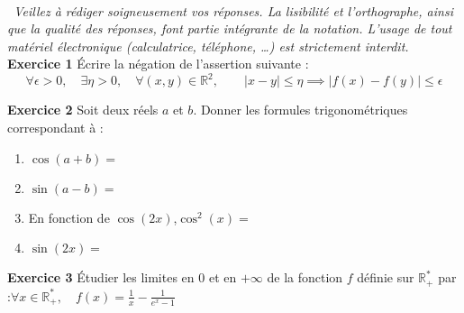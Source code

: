     \pagestyle{fancy}
    \fancyhf{}
    \cfoot{\thepage}
    
    \noindent \textsf{}\\[-25pt]
    
    \begin{center}
    \end{center}
    
    \noindent \textit{\triangleright \ Veillez à rédiger soigneusement vos réponses. La lisibilité et l'orthographe, ainsi que la qualité des réponses, font partie intégrante de la notation. L'usage de tout matériel électronique (calculatrice, téléphone, \dots) est strictement interdit.}\\
    
    
    \noindent \textbf{Exercice 1} Écrire la négation de l'assertion suivante :
    \[ \forall \epsilon > 0,\quad \exists \eta > 0,\quad \forall \left(x, y\right) \in \mathbb{R}^2,\qquad \left| x - y\right| \leq \eta \implies \left| f\left(x\right) - f\left(y\right) \right| \leq \epsilon\]
    
    \vspace{6mm}
    
    \noindent \textbf{Exercice 2} Soit deux réels $a$ et $b$. Donner les formules trigonométriques correspondant à :
    \begin{enumerate}
        \item[\bullet] $\cos\left(a + b\right) = $
        
        \item[\bullet] $\sin\left(a - b\right) = $
        
        \item[\bullet] En fonction de $\cos\left(2x\right)$,\quad $\cos^2\left(x\right) =$
        
        \item[\bullet] $\sin\left(2x\right) =$\\
    \end{enumerate}
    
    \noindent \textbf{Exercice 3} Étudier les limites en $0$ et en $+\infty$ de la fonction $f$ définie sur $\mathbb{R}_+^*$ par :\quad $\forall x \in \mathbb{R}_+^*,\quad f\left(x\right) = \frac{1}{x} - \frac{1}{e^x - 1}$
    
    \vspace{20mm}
    
